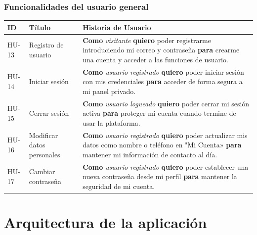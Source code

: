 \documentclass[11pt]{article}
\begin{document}
      \subsubsection{Funcionalidades del usuario general}
          \begin{table}[H]
              \centering
              \begin{tabularx}{\textwidth}{|l|p{3.5cm}|X|}
                  \hline
                  \textbf{ID} & \textbf{Título}            & \textbf{Historia de Usuario}                                                                                                                                                         \\ \hline
                  HU-13       & Registro de usuario        & \textbf{Como} \textit{visitante} \textbf{quiero} poder registrarme introduciendo mi correo y contraseña \textbf{para} crearme una cuenta y acceder a las funciones de usuario.       \\ \hline
                  HU-14       & Iniciar sesión             & \textbf{Como} \textit{usuario registrado} \textbf{quiero} poder iniciar sesión con mis credenciales \textbf{para} acceder de forma segura a mi panel privado.                        \\ \hline
                  HU-15       & Cerrar sesión              & \textbf{Como} \textit{usuario logueado} \textbf{quiero} poder cerrar mi sesión activa \textbf{para} proteger mi cuenta cuando termine de usar la plataforma.                         \\ \hline
                  HU-16       & Modificar datos personales & \textbf{Como} \textit{usuario registrado} \textbf{quiero} poder actualizar mis datos como nombre o teléfono en "Mi Cuenta» \textbf{para} mantener mi información de contacto al día. \\ \hline
                  HU-17       & Cambiar contraseña         & \textbf{Como} \textit{usuario registrado} \textbf{quiero} poder establecer una nueva contraseña desde mi perfil \textbf{para} mantener la seguridad de mi cuenta.                    \\ \hline
              \end{tabularx}
          \end{table}

          \clearpage

\section{Arquitectura de la aplicación}
\end{document}
